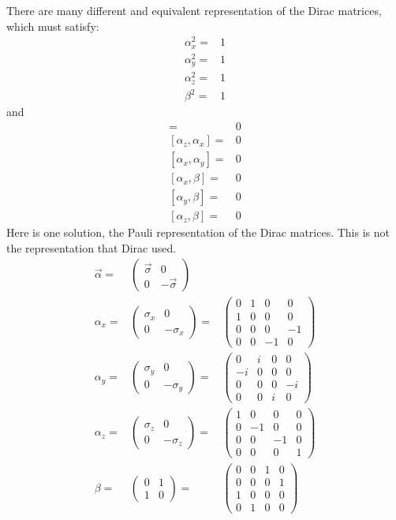 \documentclass[]{article}
\begin{document}
There are many different and equivalent representation of the Dirac matrices, which must satisfy:
\begin{align*}
	\alpha_x^2=&1  \\
	\alpha_y^2=&1  \\
	\alpha_z^2=&1  \\
	\beta^2=&1
\end{align*}
and
\begin{align*}
	[\alpha_y,\alpha_z] =&0 \\
	[\alpha_z,\alpha_x] =&0 \\
	[\alpha_x,\alpha_y ]=&0 \\
	[\alpha_x,\beta]=&0 \\
	[\alpha_y,\beta]=&0 \\
	[\alpha_z,\beta]=&0 
\end{align*}
Here is one solution, the Pauli representation of the Dirac matrices. This is not the representation that Dirac used.
\begin{align*}
	\vec{\alpha} =& \begin{pmatrix}
		\vec{\sigma}&0 \\
		0&-\vec{\sigma}
	\end{pmatrix} \\ 
	\alpha_x =& \begin{pmatrix}
		\sigma_x&0\\
		0&-\sigma_x
	\end{pmatrix}=&\begin{pmatrix}
		0&1&0&0\\
		1&0&0&0\\
		0&0&0&-1\\
		0&0&-1&0
	\end{pmatrix}\\
	\alpha_y =& \begin{pmatrix}
	\sigma_y&0\\
	0&-\sigma_y
	\end{pmatrix}=&\begin{pmatrix}
		0&i&0&0\\
		-i&0&0&0\\
		0&0&0&-i\\
		0&0&i&0
	\end{pmatrix}\\
	\alpha_z =& \begin{pmatrix}
	\sigma_z&0\\
	0&-\sigma_z
	\end{pmatrix}=&\begin{pmatrix}
		1&0&0&0\\
		0&-1&0&0\\
		0&0&-1&0\\
		0&0&0&1
	\end{pmatrix}\\
	\beta =& \begin{pmatrix}
		0&1\\
		1&0
	\end{pmatrix} =& \begin{pmatrix}
		0&0&1&0\\
		0&0&0&1\\
		1&0&0&0\\
		0&1&0&0
	\end{pmatrix}
\end{align*}
\end{document}
